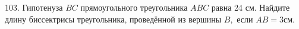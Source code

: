 103. Гипотенуза $BC$ прямоугольного треугольника $ABC$ равна 24 см. Найдите длину биссектрисы треугольника, проведённой из вершины $B,$ если $AB=3$см.\\
